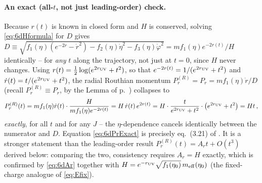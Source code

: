 \documentclass[11pt]{article}
\begin{document}
\paragraph{An exact (all-$t$, not just leading-order) check.} Because $r(t)$ is known in closed form and $H$ is conserved, solving \eqref{eq:6dHformula} for $D$ gives $D\equiv\sqrt{f_1(\eta)(e^{-2r}-\dot r^2)-f_2(\eta)\dot\eta^2-f_3(\eta)\dot\varphi^2}=mf_1(\eta)e^{-2r(t)}/H$ identically -- for \emph{any} $t$ along the trajectory, not just at $t=0$, since $H$ never changes. Using $r(t)=\tfrac12\log(e^{2r_{\rm UV}}+t^2)$, so that $e^{-2r(t)}=1/(e^{2r_{\rm UV}}+t^2)$ and $\dot r(t)=t/(e^{2r_{\rm UV}}+t^2)$, the radial Routhian momentum $P_r^{(R)}=P_r=mf_1(\eta)\dot r/D$ (recall $P_r^{(R)}\equiv P_r$, by the Lemma of p.~\pageref{lemma:routh}) collapses to
\begin{equation}
P_r^{(R)}(t) = m f_1(\eta)\dot r(t)\cdot\frac{H}{mf_1(\eta)e^{-2r(t)}} = H\,\dot r(t)\,e^{2r(t)} = H\cdot\frac{t}{e^{2r_{\rm UV}}+t^2}\cdot\big(e^{2r_{\rm UV}}+t^2\big) = H t\,,
\label{eq:6dPrExact}
\end{equation}
\emph{exactly}, for all $t$ and for any $J$ -- the $\eta$-dependence cancels identically between the numerator and $D$. Equation \eqref{eq:6dPrExact} is precisely eq.~(3.21) of \cite{Fatemiabhari:2026rob}. It is a stronger statement than the leading-order result $P_r^{(R)}(t)=A_rt+O(t^3)$ derived below: comparing the two, consistency requires $A_r=H$ exactly, which is confirmed by \eqref{eq:6dAr} together with $H=e^{-r_{\rm UV}}\sqrt{f_1(\eta_0)}\,m_{\rm eff}(\eta_0)$ (the fixed-charge analogue of \eqref{eq:Efix}).
\end{document}
